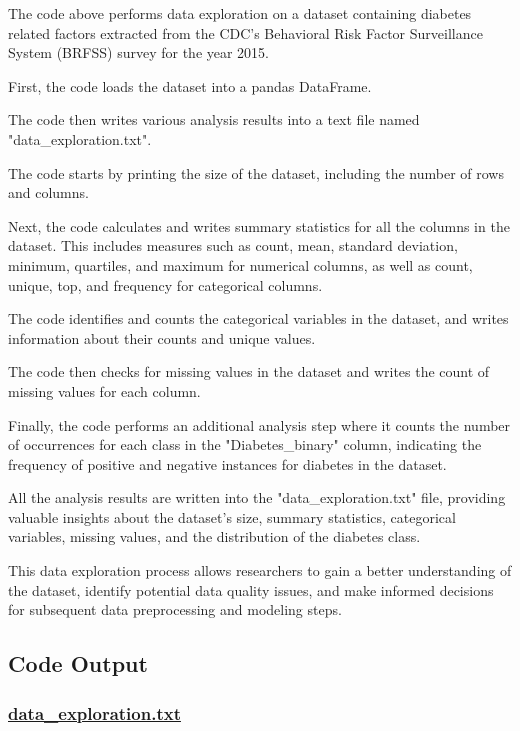 \documentclass[11pt]{article}
\begin{document}
The code above performs data exploration on a dataset containing diabetes related factors extracted from the CDC's Behavioral Risk Factor Surveillance System (BRFSS) survey for the year 2015. 

First, the code loads the dataset into a pandas DataFrame. 

The code then writes various analysis results into a text file named "data\_exploration.txt".

The code starts by printing the size of the dataset, including the number of rows and columns.

Next, the code calculates and writes summary statistics for all the columns in the dataset. This includes measures such as count, mean, standard deviation, minimum, quartiles, and maximum for numerical columns, as well as count, unique, top, and frequency for categorical columns.

The code identifies and counts the categorical variables in the dataset, and writes information about their counts and unique values.

The code then checks for missing values in the dataset and writes the count of missing values for each column.

Finally, the code performs an additional analysis step where it counts the number of occurrences for each class in the "Diabetes\_binary" column, indicating the frequency of positive and negative instances for diabetes in the dataset.

All the analysis results are written into the "data\_exploration.txt" file, providing valuable insights about the dataset's size, summary statistics, categorical variables, missing values, and the distribution of the diabetes class.

This data exploration process allows researchers to gain a better understanding of the dataset, identify potential data quality issues, and make informed decisions for subsequent data preprocessing and modeling steps.

\subsection{Code Output}\hypertarget{file-data-exploration-txt}{}

\subsubsection*{\hyperlink{code-Data Exploration-data-exploration-txt}{data\_exploration.txt}}
\end{document}
